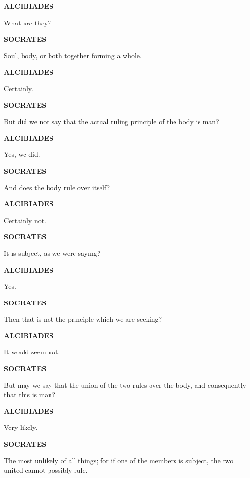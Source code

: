 \documentclass[11pt,letter]{article}
\begin{document}
\par \textbf{ALCIBIADES}
\par   What are they?

\par \textbf{SOCRATES}
\par   Soul, body, or both together forming a whole.

\par \textbf{ALCIBIADES}
\par   Certainly.

\par \textbf{SOCRATES}
\par   But did we not say that the actual ruling principle of the body is man?

\par \textbf{ALCIBIADES}
\par   Yes, we did.

\par \textbf{SOCRATES}
\par   And does the body rule over itself?

\par \textbf{ALCIBIADES}
\par   Certainly not.

\par \textbf{SOCRATES}
\par   It is subject, as we were saying?

\par \textbf{ALCIBIADES}
\par   Yes.

\par \textbf{SOCRATES}
\par   Then that is not the principle which we are seeking?

\par \textbf{ALCIBIADES}
\par   It would seem not.

\par \textbf{SOCRATES}
\par   But may we say that the union of the two rules over the body, and consequently that this is man?

\par \textbf{ALCIBIADES}
\par   Very likely.

\par \textbf{SOCRATES}
\par   The most unlikely of all things; for if one of the members is subject, the two united cannot possibly rule.
\end{document}
